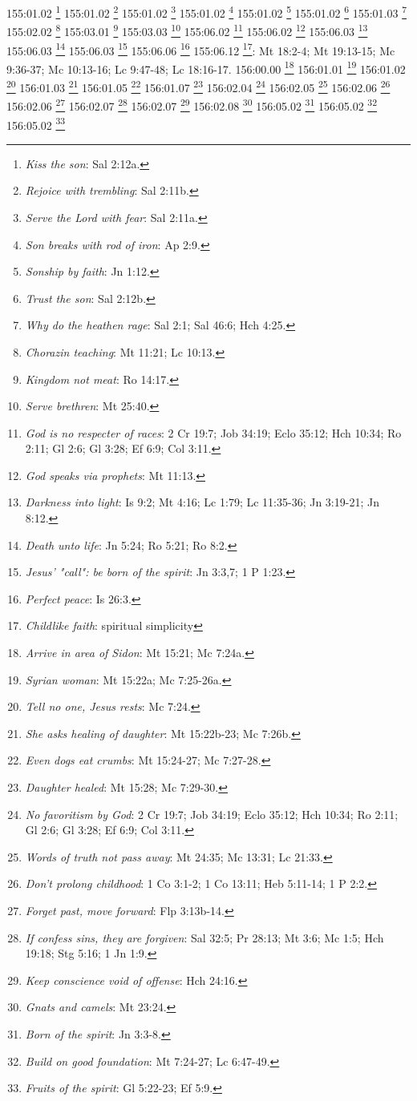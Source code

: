 {{{{{{{{{{{{{{{{{{{{{{{{{{{{{{{{{155:01.02 \footnote{\textit{Kiss the son}: Sal 2:12a.}
155:01.02 \footnote{\textit{Rejoice with trembling}: Sal 2:11b.}
155:01.02 \footnote{\textit{Serve the Lord with fear}: Sal 2:11a.}
155:01.02 \footnote{\textit{Son breaks with rod of iron}: Ap 2:9.}
155:01.02 \footnote{\textit{Sonship by faith}: Jn 1:12.}
155:01.02 \footnote{\textit{Trust the son}: Sal 2:12b.}
155:01.03 \footnote{\textit{Why do the heathen rage}: Sal 2:1; Sal 46:6; Hch 4:25.}
155:02.02 \footnote{\textit{Chorazin teaching}: Mt 11:21; Lc 10:13.}
155:03.01 \footnote{\textit{Kingdom not meat}: Ro 14:17.}
155:03.03 \footnote{\textit{Serve brethren}: Mt 25:40.}
155:06.02 \footnote{\textit{God is no respecter of races}: 2 Cr 19:7; Job 34:19; Eclo 35:12; Hch 10:34; Ro 2:11; Gl 2:6; Gl 3:28; Ef 6:9; Col 3:11.}
155:06.02 \footnote{\textit{God speaks via prophets}: Mt 11:13.}
155:06.03 \footnote{\textit{Darkness into light}: Is 9:2; Mt 4:16; Lc 1:79; Lc 11:35-36; Jn 3:19-21; Jn 8:12.}
155:06.03 \footnote{\textit{Death unto life}: Jn 5:24; Ro 5:21; Ro 8:2.}
155:06.03 \footnote{\textit{Jesus' "call": be born of the spirit}: Jn 3:3,7; 1 P 1:23.}
155:06.06 \footnote{\textit{Perfect peace}: Is 26:3.}
155:06.12 \footnote{\textit{Childlike faith}: spiritual simplicity}: Mt 18:2-4; Mt 19:13-15; Mc 9:36-37; Mc 10:13-16; Lc 9:47-48; Lc 18:16-17.}
156:00.00 \footnote{\textit{Arrive in area of Sidon}: Mt 15:21; Mc 7:24a.}
156:01.01 \footnote{\textit{Syrian woman}: Mt 15:22a; Mc 7:25-26a.}
156:01.02 \footnote{\textit{Tell no one, Jesus rests}: Mc 7:24.}
156:01.03 \footnote{\textit{She asks healing of daughter}: Mt 15:22b-23; Mc 7:26b.}
156:01.05 \footnote{\textit{Even dogs eat crumbs}: Mt 15:24-27; Mc 7:27-28.}
156:01.07 \footnote{\textit{Daughter healed}: Mt 15:28; Mc 7:29-30.}
156:02.04 \footnote{\textit{No favoritism by God}: 2 Cr 19:7; Job 34:19; Eclo 35:12; Hch 10:34; Ro 2:11; Gl 2:6; Gl 3:28; Ef 6:9; Col 3:11.}
156:02.05 \footnote{\textit{Words of truth not pass away}: Mt 24:35; Mc 13:31; Lc 21:33.}
156:02.06 \footnote{\textit{Don't prolong childhood}: 1 Co 3:1-2; 1 Co 13:11; Heb 5:11-14; 1 P 2:2.}
156:02.06 \footnote{\textit{Forget past, move forward}: Flp 3:13b-14.}
156:02.07 \footnote{\textit{If confess sins, they are forgiven}: Sal 32:5; Pr 28:13; Mt 3:6; Mc 1:5; Hch 19:18; Stg 5:16; 1 Jn 1:9.}
156:02.07 \footnote{\textit{Keep conscience void of offense}: Hch 24:16.}
156:02.08 \footnote{\textit{Gnats and camels}: Mt 23:24.}
156:05.02 \footnote{\textit{Born of the spirit}: Jn 3:3-8.}
156:05.02 \footnote{\textit{Build on good foundation}: Mt 7:24-27; Lc 6:47-49.}
156:05.02 \footnote{\textit{Fruits of the spirit}: Gl 5:22-23; Ef 5:9.}
}}}}}}}}}}}}}}}}}}}}}}}}}}}}}}}}
